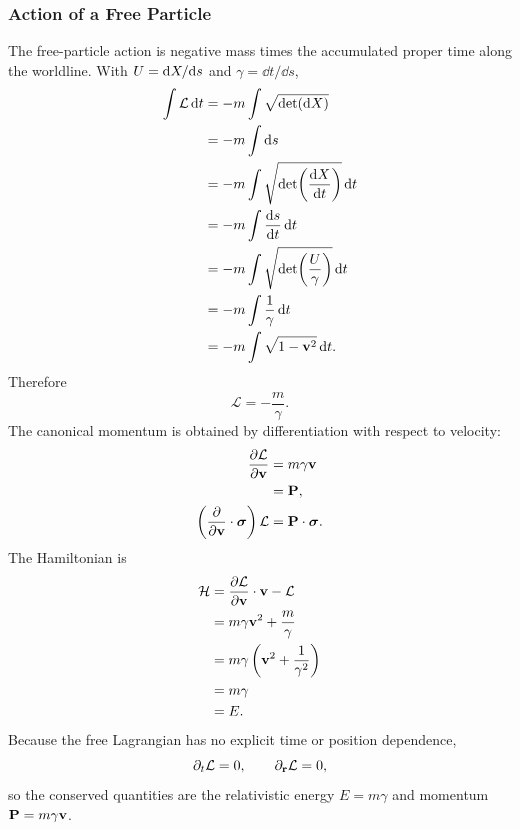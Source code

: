 \subsubsection{Action of a Free Particle}
The free-particle action is negative mass times the accumulated proper time
along the worldline. With \(U=\mathrm dX/\mathrm d s\) and
\(\gamma=\dd t/\dd s\),
\begin{align*}
\int \mathcal L\,\mathrm d t
&=-m\int \sqrt{\operatorname{det}\!\left(\mathrm dX\right)}\notag\\
&=-m\int \mathrm d s\notag\\
&=-m\int \sqrt{\operatorname{det}\!\left(\frac{\mathrm dX}{\mathrm d t}\right)}\,\mathrm d t\notag\\
&=-m\int \frac{\mathrm d s}{\mathrm d t}\,\mathrm d t\notag\\
&=-m\int \sqrt{\operatorname{det}\!\left(\frac{U}{\gamma}\right)}\,\mathrm d t\notag\\
&=-m\int \frac{1}{\gamma}\,\mathrm d t\notag\\
&=-m\int \sqrt{1-\mathbf{v}^2}\,\mathrm d t.
\end{align*}
Therefore
\begin{equation*}
\mathcal L=-\frac{m}{\gamma}.
\end{equation*}
The canonical momentum is obtained by differentiation with respect to velocity:
\begin{align*}
\frac{\partial\mathcal L}{\partial\mathbf{v}}
&=m\gamma\mathbf{v}\notag\\
&=\mathbf{P},\\
\left(\frac{\partial}{\partial\mathbf{v}}\cdot\mathbf{\bm{\sigma}}\right)\mathcal L
&=\mathbf{P}\cdot\mathbf{\bm{\sigma}}.
\end{align*}
The Hamiltonian is
\begin{align*}
\mathcal H
&=\frac{\partial\mathcal L}{\partial\mathbf{v}}\cdot\mathbf{v}
-\mathcal L\notag\\
&=m\gamma\mathbf{v}^2+\frac{m}{\gamma}\notag\\
&=m\gamma\left(\mathbf{v}^2+\frac{1}{\gamma^2}\right)\notag\\
&=m\gamma\notag\\
&=E.
\end{align*}
Because the free Lagrangian has no explicit time or position dependence,
\begin{equation*}
\partial_t\mathcal L=0,
\qquad
\partial_{\mathbf{r}}\mathcal L=0,
\end{equation*}
so the conserved quantities are the relativistic energy \(E=m\gamma\) and momentum \(\mathbf{P}=m\gamma\mathbf{v}\).

